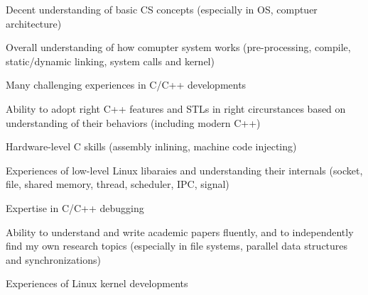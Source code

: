 


\begin{cventries}

\begin{small}
    {
      \begin{cvitems} %
        \item {Decent understanding of basic CS concepts (especially in OS, comptuer architecture)}
	\item {Overall understanding of how comupter system works (pre-processing, compile, static/dynamic linking, system calls and kernel)}
	\item {Many challenging experiences in C/C++ developments}
	\item {Ability to adopt right C++ features and  STLs in right circurstances based on understanding of their behaviors (including modern C++)}
	\item {Hardware-level C skills (assembly inlining, machine code injecting)} 
	\item {Experiences of low-level Linux libaraies and understanding their internals (socket, file, shared memory, thread, scheduler, IPC, signal)}
	\item {Expertise in C/C++ debugging}
	\item {Ability to understand and write academic papers fluently, and to independently find my own research topics (especially in file systems, parallel data structures and synchronizations)}
	\item {Experiences of Linux kernel developments}
	\newline
      \end{cvitems}
    }
\end{small}

\end{cventries}


